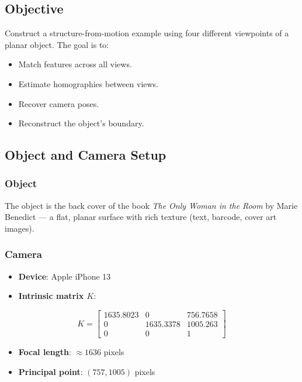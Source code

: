 \documentclass[12pt, a4paper]{article}
\begin{document}
\subsection{Objective}

Construct a structure-from-motion example using four different viewpoints of a planar object. The goal is to:
\begin{itemize}
  \item Match features across all views.
  \item Estimate homographies between views.
  \item Recover camera poses.
  \item Reconstruct the object's boundary.
\end{itemize}

\subsection{Object and Camera Setup}

\subsubsection{Object}

The object is the back cover of the book \emph{The Only Woman in the Room} by Marie Benedict --- a flat, planar surface with rich texture (text, barcode, cover art images).

\subsubsection{Camera}

\begin{itemize}
  \item \textbf{Device}: Apple iPhone 13
  \item \textbf{Intrinsic matrix $K$}:
\end{itemize}

\begin{equation}
  K = \begin{bmatrix}
    1635.8023 & 0 & 756.7658\\
    0 & 1635.3378 & 1005.263\\
    0 & 0 & 1
  \end{bmatrix}
  \label{eq:K}
\end{equation}

\begin{itemize}
  \item \textbf{Focal length}: $\approx 1636$ pixels
  \item \textbf{Principal point}: $(757, 1005)$ pixels
\end{itemize}
\end{document}
